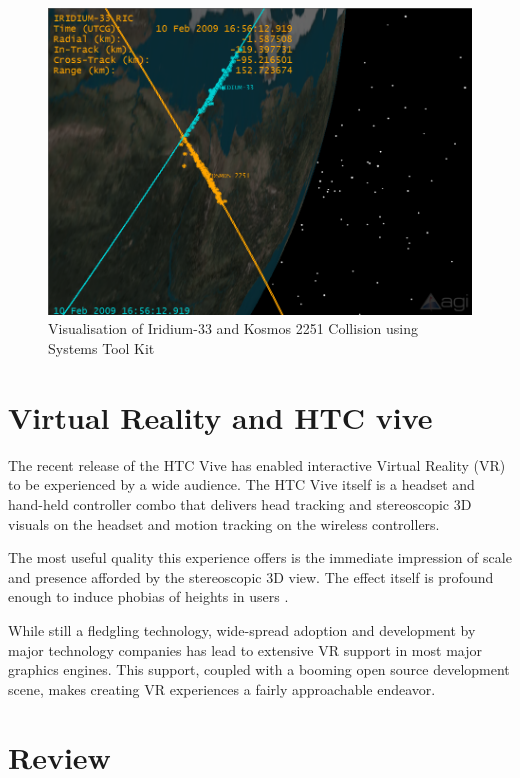 \documentclass[12pt,openany,a4paper]{book}
\begin{document}
		
			\begin{figure}[H]
				\centering
				\caption{Visualisation of Iridium-33 and Kosmos 2251 Collision using Systems Tool Kit}
				\label{AGI}
				\includegraphics[scale=0.45]{AGI.png}
			\end{figure}
		
		\section{Virtual Reality and HTC vive}
		The recent release of the HTC Vive has enabled interactive Virtual Reality (VR) to be experienced by a wide audience. The HTC Vive itself is a headset and hand-held controller combo that delivers head tracking and stereoscopic 3D visuals on the headset and motion tracking on the wireless controllers.
		
		The most useful quality this experience offers is the immediate impression of scale and presence afforded by the stereoscopic 3D view. The effect itself is profound enough to induce phobias of heights in users \cite{heights}.  \newline
		
		While still a fledgling technology, wide-spread adoption and development by major technology companies has lead to extensive VR support in most major graphics engines. This support, coupled with a booming open source development scene, makes creating VR experiences a fairly approachable endeavor.
		\section{Review}
		
\end{document}
